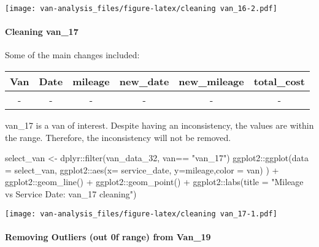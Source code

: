 \documentclass[
]{article}
\newenvironment{Shaded}{\begin{snugshade}}{\end{snugshade}}
\newcommand{\AttributeTok}[1]{\textcolor[rgb]{0.77,0.63,0.00}{#1}}
\newcommand{\FunctionTok}[1]{\textcolor[rgb]{0.00,0.00,0.00}{#1}}
\newcommand{\NormalTok}[1]{#1}
\newcommand{\OtherTok}[1]{\textcolor[rgb]{0.56,0.35,0.01}{#1}}
\newcommand{\SpecialCharTok}[1]{\textcolor[rgb]{0.00,0.00,0.00}{#1}}
\newcommand{\StringTok}[1]{\textcolor[rgb]{0.31,0.60,0.02}{#1}}
\begin{document}
\texttt{[image: van-analysis\_files/figure-latex/cleaning van\_16-2.pdf]}

\hypertarget{cleaning-van_17}{%
\paragraph{Cleaning van\_17}\label{cleaning-van_17}}

Some of the main changes included:

\begin{longtable}[]{@{}cccccc@{}}
\toprule()
Van & Date & mileage & new\_date & new\_mileage & total\_cost \\
\midrule()
\endhead
- & - & - & - & - & - \\
\bottomrule()
\end{longtable}

van\_17 is a van of interest. Despite having an inconsistency, the
values are within the range. Therefore, the inconsistency will not be
removed.

\begin{Shaded}
\begin{Highlighting}[]
\NormalTok{select\_van }\OtherTok{\textless{}{-}}\NormalTok{ dplyr}\SpecialCharTok{::}\FunctionTok{filter}\NormalTok{(van\_data\_32, van}\SpecialCharTok{==} \StringTok{"van\_17"}\NormalTok{)}
\NormalTok{ ggplot2}\SpecialCharTok{::}\FunctionTok{ggplot}\NormalTok{(}\AttributeTok{data =}\NormalTok{ select\_van, ggplot2}\SpecialCharTok{::}\FunctionTok{aes}\NormalTok{(}\AttributeTok{x=}\NormalTok{ service\_date, }\AttributeTok{y=}\NormalTok{mileage,}\AttributeTok{color =}\NormalTok{ van) ) }\SpecialCharTok{+}\NormalTok{ ggplot2}\SpecialCharTok{::}\FunctionTok{geom\_line}\NormalTok{() }\SpecialCharTok{+}\NormalTok{ ggplot2}\SpecialCharTok{::}\FunctionTok{geom\_point}\NormalTok{() }\SpecialCharTok{+}\NormalTok{  ggplot2}\SpecialCharTok{::}\FunctionTok{labs}\NormalTok{(}\AttributeTok{title =} \StringTok{"Mileage vs Service Date: van\_17 cleaning"}\NormalTok{)}
\end{Highlighting}
\end{Shaded}

\texttt{[image: van-analysis\_files/figure-latex/cleaning van\_17-1.pdf]}

\hypertarget{removing-outliers-out-0f-range-from-van_19}{%
\paragraph{Removing Outliers (out 0f range) from
Van\_19}\label{removing-outliers-out-0f-range-from-van_19}}
\end{document}
